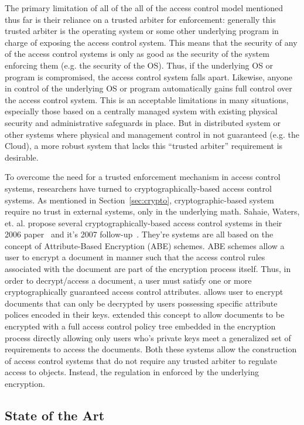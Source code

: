 \documentclass{sig-alternate}
\begin{document}
The primary limitation of all of the all of the access control model
mentioned thus far is their reliance on a trusted arbiter for
enforcement: generally this trusted arbiter is the operating system or
some other underlying program in charge of exposing the access control
system. This means that the security of any of the access control
systems is only as good as the security of the system enforcing them
(e.g. the security of the OS). Thus, if the underlying OS or program
is compromised, the access control system falls apart. Likewise,
anyone in control of the underlying OS or program automatically gains
full control over the access control system. This is an acceptable
limitations in many situations, especially those based on a centrally
managed system with existing physical security and administrative
safeguards in place. But in distributed system or other systems where
physical and management control in not guaranteed (e.g. the Cloud), a
more robust system that lacks this ``trusted arbiter'' requirement is
desirable.

To overcome the need for a trusted enforcement mechanism in access
control systems, researchers have turned to cryptographically-based
access control systems. As mentioned in Section~\ref{sec:crypto},
cryptographic-based system require no trust in external systems, only
in the underlying math. Sahaie, Waters, et. al. propose several
cryptographically-based access control systems in their 2006
paper~\cite{Goyal2006} and it's 2007
follow-up~\cite{Bethencourt2007}. They're systems are all based on the
concept of Attribute-Based Encryption (ABE) schemes. ABE schemes allow
a user to encrypt a document in manner such that the access control
rules associated with the document are part of the encryption process
itself. Thus, in order to decrypt/access a document, a user must
satisfy one or more cryptographically guaranteed access control
attributes. \cite{Goyal2006} allows user to encrypt documents that can
only be decrypted by users possessing specific attribute polices
encoded in their keys. \cite{Bethencourt2007} extended this concept to
allow documents to be encrypted with a full access control policy tree
embedded in the encryption process directly allowing only users who's
private keys meet a generalized set of requirements to access the
documents. Both these systems allow the construction of access control
systems that do not require any trusted arbiter to regulate access to
objects. Instead, the regulation in enforced by the underlying
encryption.

\subsection{State of the Art}
\end{document}
